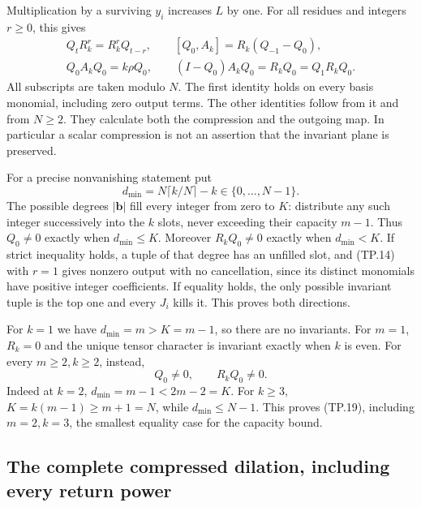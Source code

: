 Multiplication by a surviving \(y_i\) increases \(L\) by one.
For all residues and integers \(r\geq0\), this gives
\[
 \begin{gathered}
 Q_t R_k^r=R_k^r Q_{t-r},\qquad
 [Q_0,A_k]=R_k(Q_{-1}-Q_0),\\
 Q_0A_kQ_0=k\rho Q_0,\qquad
 (I-Q_0)A_kQ_0=R_kQ_0=Q_1R_kQ_0.
 \end{gathered}
 \tag{TP.17}\label{CFStage:eq:tp-leakage}
\]
All subscripts are taken modulo \(N\). The first identity
holds on every basis monomial, including zero output terms.
The other identities follow from it and from \(N\geq2\).
They calculate both the compression and the outgoing map.
In particular a scalar compression is not an assertion that
the invariant plane is preserved.

For a precise nonvanishing statement put
\[
 d_{\min}=N\lceil k/N\rceil-k\in\{0,\ldots,N-1\}.
 \tag{TP.18}\label{CFStage:eq:tp-minimum}
\]
The possible degrees \(|\mathbf b|\) fill every integer from
zero to \(K\): distribute any such integer successively into
the \(k\) slots, never exceeding their capacity \(m-1\).
Thus \(Q_0\ne0\) exactly when \(d_{\min}\leq K\).
Moreover \(R_kQ_0\ne0\) exactly when \(d_{\min}<K\).
If strict inequality holds, a tuple of that degree has an
unfilled slot, and (TP.14) with \(r=1\) gives nonzero output
with no cancellation, since its distinct monomials have
positive integer coefficients. If equality holds, the only
possible invariant tuple is the top one and every \(J_i\)
kills it. This proves both directions.

For \(k=1\) we have \(d_{\min}=m>K=m-1\), so there are no
invariants. For \(m=1\), \(R_k=0\) and the unique tensor
character is invariant exactly when \(k\) is even.
For every \(m\geq2,k\geq2\), instead,
\[
 Q_0\ne0,\qquad R_kQ_0\ne0.
 \tag{TP.19}\label{CFStage:eq:tp-nonzero}
\]
Indeed at \(k=2\), \(d_{\min}=m-1<2m-2=K\).
For \(k\geq3\), \(K=k(m-1)\geq m+1=N\), while
\(d_{\min}\leq N-1\). This proves (TP.19), including
\(m=2,k=3\), the smallest equality case for the capacity bound.

\subsection{The complete compressed dilation, including every return power}

